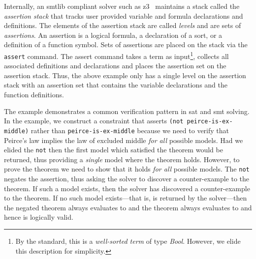 Internally, an \acl{smtlib} compliant solver such as
z3~\cite{10.1007/978-3-540-78800-3_24} maintains a stack called the
\emph{assertion stack} that tracks user provided variable and formula
declarations and definitions. The elements of the assertion stack are called
\emph{levels} and are sets of \emph{assertions}.
%
An assertion is a logical formula, a declaration of a sort, or a definition of a
function symbol. Sets of assertions are placed on the stack via the
\lstinline{assert} command. The assert command takes a term as input\footnote{By
  the standard, this is a \emph{well-sorted term} of type \emph{Bool}. However,
  we elide this description for simplicity.}, collects all associated
definitions and declarations and places the assertion set on the assertion
stack. Thus, the above example only has a single level on the assertion stack
with an assertion set that contains the variable declarations and the function
definitions.

The example demonstrates a common verification pattern in \ac{sat} and \ac{smt}
solving. In the example, we construct a constraint that asserts
\lstinline{(not peirce-is-ex-middle)} rather than
\lstinline{peirce-is-ex-middle} because we need to verify that Peirce's law
implies the law of excluded middle \emph{for all} possible models. Had we elided
the \lstinline{not} then the first model which satisfied the theorem would be
returned, thus providing a \emph{single} model where the theorem holds. However,
to prove the theorem we need to show that it holds \emph{for all} possible
models. The \lstinline{not} negates the assertion, thus asking the solver to
discover a counter-example to the theorem. If such a model exists, then the
solver has discovered a counter-example to the theorem. If no such model
exists---that is,  is returned by the solver---then the negated
theorem always evaluates to \fls{} and the theorem always evaluates to \tru{}
and hence is logically valid.



